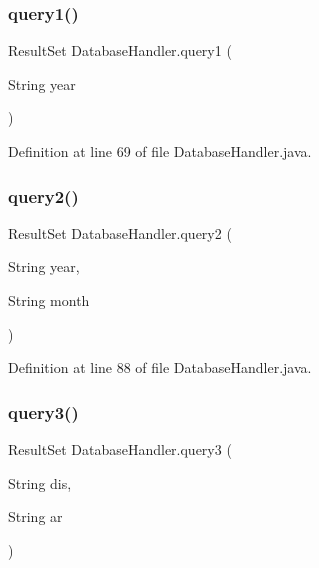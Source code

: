 \mbox{\label{class_database_handler_ace2c7efee64daaf77266b6666614e017}} 
\subsubsection{\texorpdfstring{query1()}{query1()}}
{\footnotesize\ttfamily Result\+Set Database\+Handler.\+query1 (\begin{DoxyParamCaption}\item[{String}]{year }\end{DoxyParamCaption})}



Definition at line 69 of file Database\+Handler.\+java.

\mbox{\label{class_database_handler_a079a6fbfaebaef4ae960c884bca7ac19}} 
\subsubsection{\texorpdfstring{query2()}{query2()}}
{\footnotesize\ttfamily Result\+Set Database\+Handler.\+query2 (\begin{DoxyParamCaption}\item[{String}]{year,  }\item[{String}]{month }\end{DoxyParamCaption})}



Definition at line 88 of file Database\+Handler.\+java.

\mbox{\label{class_database_handler_ab41175ec78b0fbe34153dae92b05ff3c}} 
\subsubsection{\texorpdfstring{query3()}{query3()}}
{\footnotesize\ttfamily Result\+Set Database\+Handler.\+query3 (\begin{DoxyParamCaption}\item[{String}]{dis,  }\item[{String}]{ar }\end{DoxyParamCaption})}




